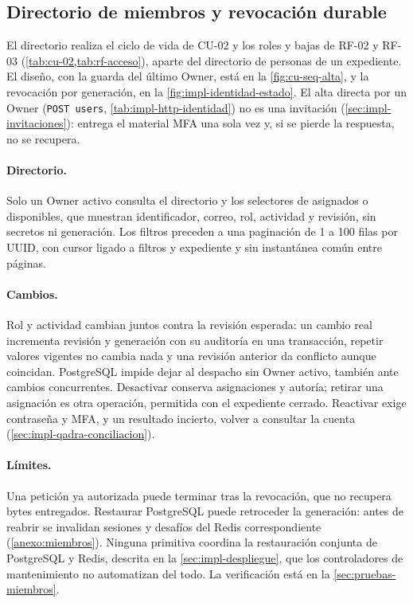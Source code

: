 \subsection{Directorio de miembros y revocación durable}\label{sec:impl-miembros}

El directorio realiza el ciclo de vida de CU-02 y los roles y bajas de RF-02 y RF-03 (\cref{tab:cu-02,tab:rf-acceso}), aparte del directorio de personas de un expediente. El diseño, con la guarda del último Owner, está en la \cref{fig:cu-seq-alta}, y la revocación por generación, en la \cref{fig:impl-identidad-estado}. El alta directa por un Owner (\texttt{POST users}, \cref{tab:impl-http-identidad}) no es una invitación (\cref{sec:impl-invitaciones}): entrega el material MFA una sola vez y, si se pierde la respuesta, no se recupera.

\paragraph{Directorio.} Solo un Owner activo consulta el directorio y los selectores de asignados o disponibles, que muestran identificador, correo, rol, actividad y revisión, sin secretos ni generación. Los filtros preceden a una paginación de 1 a 100 filas por UUID, con cursor ligado a filtros y expediente y sin instantánea común entre páginas.

\paragraph{Cambios.} Rol y actividad cambian juntos contra la revisión esperada: un cambio real incrementa revisión y generación con su auditoría en una transacción, repetir valores vigentes no cambia nada y una revisión anterior da conflicto aunque coincidan. PostgreSQL impide dejar al despacho sin Owner activo, también ante cambios concurrentes. Desactivar conserva asignaciones y autoría; retirar una asignación es otra operación, permitida con el expediente cerrado. Reactivar exige contraseña y MFA, y un resultado incierto, volver a consultar la cuenta (\cref{sec:impl-qadra-conciliacion}).

\paragraph{Límites.} Una petición ya autorizada puede terminar tras la revocación, que no recupera bytes entregados. Restaurar PostgreSQL puede retroceder la generación: antes de reabrir se invalidan sesiones y desafíos del Redis correspondiente (\cref{anexo:miembros}). Ninguna primitiva coordina la restauración conjunta de PostgreSQL y Redis, descrita en la \cref{sec:impl-despliegue}, que los controladores de mantenimiento no automatizan del todo. La verificación está en la \cref{sec:pruebas-miembros}.

